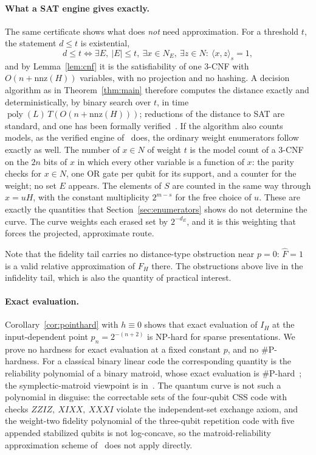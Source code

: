\documentclass[11pt]{article}
\theoremstyle{remark}
\newcommand{\poly}{\operatorname{poly}}
\newcommand{\pair}[2]{\langle #1,#2\rangle_s}
\begin{document}
\paragraph{What a SAT engine gives exactly.}
The same certificate shows what does \emph{not} need approximation. For
a threshold \(t\), the statement \(d\le t\) is existential,
\[
 d\le t\iff\exists E,\ |E|\le t,\ \exists x\in N_E,\ \exists z\in N:\
 \pair xz=1,
\]
and by Lemma~\ref{lem:cnf} it is the satisfiability of one 3-CNF with
\(O(n+\mathrm{nnz}(H))\) variables, with no projection and no hashing.
A decision algorithm as in Theorem~\ref{thm:main} therefore computes the
distance exactly and deterministically, by binary search over \(t\), in
time \(\poly(L)\,T(O(n+\mathrm{nnz}(H)))\); reductions of the distance to
SAT are standard, and one has been formally
verified~\cite{leanqec2026}. If the algorithm also counts models, as the
verified engine of~\cite{openai2026eth} does, the ordinary weight
enumerators follow exactly as well. The number of \(x\in N\) of weight
\(t\) is the model count of a 3-CNF on the \(2n\) bits of \(x\) in which
every other variable is a function of \(x\): the parity checks for
\(x\in N\), one OR gate per qubit for its support, and a counter for the
weight; no set \(E\) appears. The elements of \(S\) are counted in the
same way through \(x=uH\), with the constant multiplicity \(2^{m-s}\) for
the free choice of \(u\). These are exactly
the quantities that Section~\ref{sec:enumerators} shows do not determine
the curve. The curve weights each erased set by \(2^{-d_E}\), and it is
this weighting that forces the projected, approximate route.

Note that the fidelity tail carries no distance-type obstruction near
\(p=0\): \(\widehat F=1\) is a valid relative approximation of \(F_H\)
there. The obstructions above live in the infidelity tail, which is also
the quantity of practical interest.

\paragraph{Exact evaluation.}
Corollary~\ref{cor:pointhard} with \(h\equiv0\) shows that exact
evaluation of \(I_H\) at the input-dependent point \(p_n=2^{-(n+2)}\) is
NP-hard for sparse presentations. We prove no hardness for exact
evaluation at a fixed constant \(p\), and no \#P-hardness. For a
classical binary linear code the corresponding quantity is the
reliability polynomial of a binary matroid, whose exact evaluation is
\#P-hard~\cite{colbourn1987,britz2002,provanball1983,jvw1990}; the
symplectic-matroid viewpoint is in~\cite{sarvepalli2011}. The quantum
curve is not such a polynomial in disguise: the correctable sets of the
four-qubit CSS code with checks \(ZZIZ,\ XIXX,\ XXXI\) violate the
independent-set exchange axiom, and the weight-two fidelity polynomial
of the three-qubit repetition code with five appended stabilized qubits
is not log-concave, so the matroid-reliability approximation scheme
of~\cite{alov2024} does not apply directly.
\end{document}
